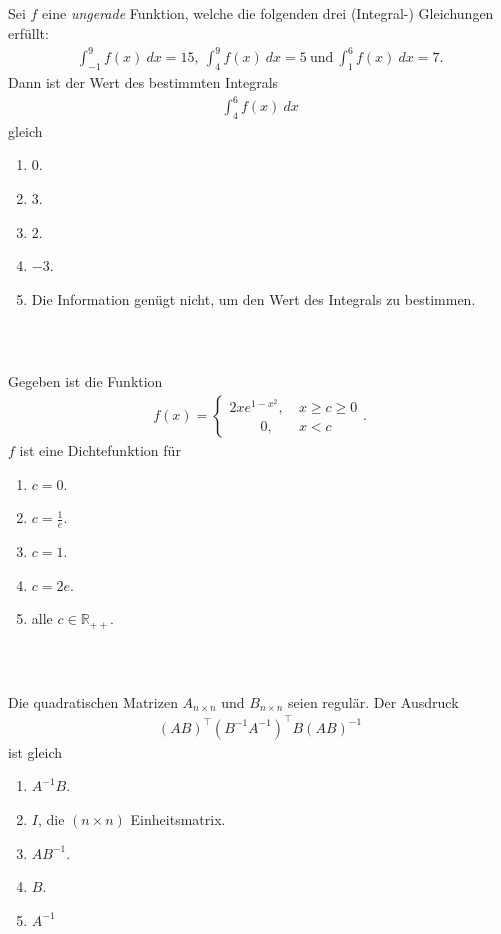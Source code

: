 \subsection*{}
Sei $ f $ eine \textit{ungerade} Funktion, welche die folgenden drei (Integral-) Gleichungen erfüllt:
\begin{align*}
	\int_{-1}^9 f(x) \ dx = 15, \
	\int_4^9 f(x) \ dx = 5 \ \textrm{und} \
	\int_1^6 f(x) \ dx = 7.
\end{align*}
Dann ist der Wert des bestimmten Integrals
\begin{align*}
	\int_4^6 f(x) \ dx
\end{align*}  
gleich
\renewcommand{\labelenumi}{(\alph{enumi})}
\begin{enumerate}
	\item 
	$ 0 $.
	\item
	$ 3 $.
	\item
	$ 2 $.
	\item
	$ -3 $.
	\item
	Die Information genügt nicht, um den Wert des Integrals zu bestimmen.
\end{enumerate}
\ \\
\subsection*{}
Gegeben ist die Funktion
\begin{align*}
f(x) =
\begin{cases}
	 2 x  e^{1 - x^2}, \ &x \geq c  \geq 0\\
 \qquad	\ 0 , \ &x < c
\end{cases}.
\end{align*}
$ f $ ist eine Dichtefunktion für
\renewcommand{\labelenumi}{(\alph{enumi})}
\begin{enumerate}
\item 
$ c = 0 $.
\item 
$ c = \frac{1}{e} $.
\item 
$ c= 1 $.
\item 
$ c = 2e $.
\item
alle $ c \in \mathbb{R}_{++} $.
\end{enumerate}
\ \\
\subsection*{}
Die quadratischen Matrizen $ A_{n \times n} $ und $ B_{n \times n} $ seien regulär.
Der Ausdruck
\begin{align*}
	(A B)^\top(B^{-1} A^{-1})^\top B (AB)^{-1}
\end{align*}
ist gleich
\renewcommand{\labelenumi}{(\alph{enumi})}
\begin{enumerate}
	\item 
	$ A^{-1} B $.
	\item 
	$ I $, die $ (n \times n) $ Einheitsmatrix.
	\item
	$ AB^{-1} $.
	\item
	$ B $.
	\item 
	$ A^{-1} $
\end{enumerate}
\ \\
